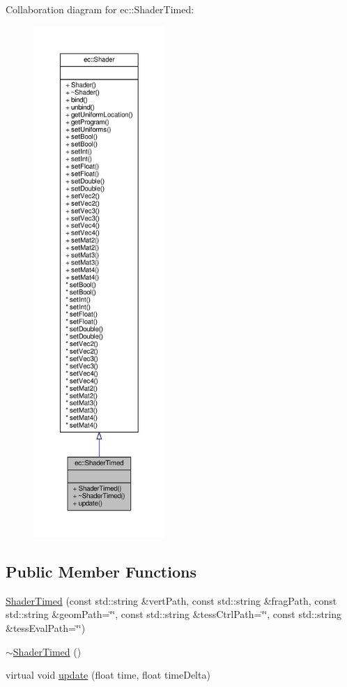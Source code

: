 Collaboration diagram for ec\+:\+:Shader\+Timed\+:\nopagebreak
\begin{figure}[H]
\begin{center}
\leavevmode
\includegraphics[height=550pt]{classec_1_1_shader_timed__coll__graph}
\end{center}
\end{figure}
\subsection*{Public Member Functions}
\begin{DoxyCompactItemize}
\item 
\mbox{\hyperlink{classec_1_1_shader_timed_ae02144800facf155732c2c38d8d64297}{Shader\+Timed}} (const std\+::string \&vert\+Path, const std\+::string \&frag\+Path, const std\+::string \&geom\+Path=\char`\"{}\char`\"{}, const std\+::string \&tess\+Ctrl\+Path=\char`\"{}\char`\"{}, const std\+::string \&tess\+Eval\+Path=\char`\"{}\char`\"{})
\item 
\mbox{\hyperlink{classec_1_1_shader_timed_aa0f0ed52039ab46266010bcf9c2131fb}{$\sim$\+Shader\+Timed}} ()
\item 
virtual void \mbox{\hyperlink{classec_1_1_shader_timed_abaeaa76b098bc4602075da0ad8b7284a}{update}} (float time, float time\+Delta)
\end{DoxyCompactItemize}


